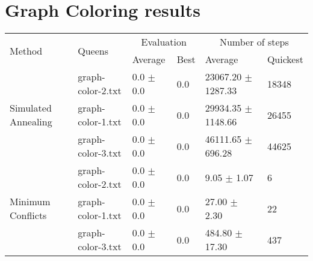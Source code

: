 \section{Graph Coloring results}

\begin{table*}\centering
    \caption{}
    \label{tab:graphcoloring}
	\vspace{2mm}
	\begin{tabular}{llllll}
		\toprule[2.0px]
			\multirow{2}{*}{Method} & 
			\multirow{2}{*}{Queens} & 
			\multicolumn{2}{c}{Evaluation} 	& 
			\multicolumn{2}{c}{Number of steps}\\
			   &          & Average & Best & Average & Quickest \\ 
		\midrule
		\multirow{3}{*}{Simulated Annealing} 
			& graph-color-2.txt & 0.0 $\pm$ 0.0 & 0.0 & 23067.20 $\pm$ 1287.33 & 18348\\ %
			& graph-color-1.txt & 0.0 $\pm$ 0.0 & 0.0 & 29934.35 $\pm$ 1148.66 & 26455\\ %
			& graph-color-3.txt & 0.0 $\pm$ 0.0 & 0.0 & 46111.65 $\pm$ 696.28 & 44625 \\ %
		\midrule
		\multirow{3}{*}{Minimum Conflicts}
			& graph-color-2.txt & 0.0 $\pm$ 0.0 & 0.0 & 9.05 $\pm$ 1.07 & 6\\ %
			& graph-color-1.txt & 0.0 $\pm$ 0.0 & 0.0 & 27.00 $\pm$ 2.30 & 22\\ %
			& graph-color-3.txt & 0.0 $\pm$ 0.0 & 0.0 & 484.80 $\pm$ 17.30 & 437 \\ %
		\bottomrule[2.0px]
	\end{tabular}
\end{table*}